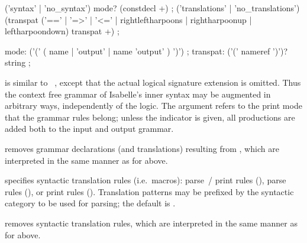 \begin{isabellebody}
\begin{isamarkuptext}



  \begin{rail}
    ('syntax' | 'no\_syntax') mode? (constdecl +)
    ;
    ('translations' | 'no\_translations') (transpat ('==' | '=>' | '<=' | rightleftharpoons | rightharpoonup | leftharpoondown) transpat +)
    ;

    mode: ('(' ( name | 'output' | name 'output' ) ')')
    ;
    transpat: ('(' nameref ')')? string
    ;
  \end{rail}

  \begin{descr}
  
  \item [\isa{\isacommand{syntax}}~\isa{{\isacharparenleft}mode{\isacharparenright}\ decls}] is similar to
  ~, except that the actual logical
  signature extension is omitted.  Thus the context free grammar of
  Isabelle's inner syntax may be augmented in arbitrary ways,
  independently of the logic.  The  argument refers to the
  print mode that the grammar rules belong; unless the  indicator is given, all productions are added both to the
  input and output grammar.
  
  \item [\isa{\isacommand{no{\isacharunderscore}syntax}}~\isa{{\isacharparenleft}mode{\isacharparenright}\ decls}] removes
  grammar declarations (and translations) resulting from , which are interpreted in the same manner as for  above.
  
  \item [\isa{\isacommand{translations}}~\isa{rules}] specifies syntactic
  translation rules (i.e.\ macros): parse~/ print rules (\isa{{\isasymrightleftharpoons}}),
  parse rules (\isa{{\isasymrightharpoonup}}), or print rules (\isa{{\isasymleftharpoondown}}).
  Translation patterns may be prefixed by the syntactic category to be
  used for parsing; the default is .
  
  \item [\isa{\isacommand{no{\isacharunderscore}translations}}~\isa{rules}] removes syntactic
  translation rules, which are interpreted in the same manner as for
   above.


\end{descr}
\end{isamarkuptext}
\end{isabellebody}
